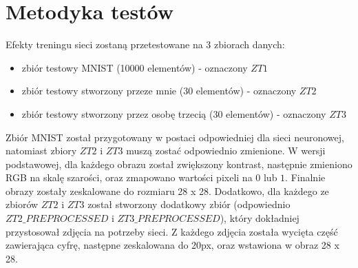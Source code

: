 \section*{Metodyka testów}
Efekty treningu sieci zostaną przetestowane na 3 zbiorach danych:
\begin{itemize}
    \item zbiór testowy MNIST (10000 elementów) - oznaczony $ZT1$
    \item zbiór testowy stworzony przeze mnie (30 elementów) - oznaczony $ZT2$
    \item zbiór testowy stworzony przez osobę trzecią (30 elementów) - oznaczony $ZT3$
\end{itemize}
Zbiór MNIST został przygotowany w postaci odpowiedniej dla sieci neuronowej, natomiast zbiory $ZT2$ i $ZT3$ muszą zostać odpowiednio zmienione. W wersji podstawowej, dla każdego obrazu został zwiększony kontrast, następnie zmieniono RGB na skalę szarości, oraz zmapowano wartości pixeli na $0$ lub $1$. Finalnie obrazy zostały zeskalowane do rozmiaru 28 x 28. Dodatkowo, dla każdego ze zbiorów $ZT2$ i $ZT3$ został stworzony dodatkowy zbiór (odpowiednio $ZT2\_PREPROCESSED$ i $ZT3\_PREPROCESSED$), który dokładniej przystosował zdjęcia na potrzeby sieci. Z każdego zdjęcia została wycięta część zawierająca cyfrę, następne zeskalowana do 20px, oraz wstawiona w obraz 28 x 28.

